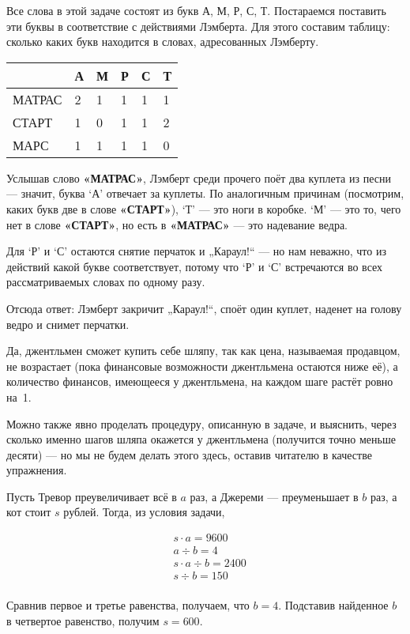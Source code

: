 
\begin{itemize}
\itA Все слова в этой задаче состоят из букв А, М, Р, С, Т. Постараемся поставить эти буквы в соответствие с действиями Лэмберта. Для этого составим таблицу: сколько каких букв находится в словах, адресованных Лэмберту.

\begin{center} \begin{tabular}{|l|l|l|l|l|l|}
\hline		& А & М & Р & С & Т \\ \hline
\ttfamily МАТРАС & 2 & 1 & 1 & 1 & 1 \\ \hline
\ttfamily СТАРТ & 1 & 0 & 1 & 1 & 2 \\ \hline
\ttfamily МАРС & 1 & 1 & 1 & 1 & 0 \\ \hline
\end{tabular} \end{center}

Услышав слово {\bfseries«МАТРАС»}, Лэмберт среди прочего поёт два куплета из песни — значит, буква `А' отвечает за куплеты. По аналогичным причинам (посмотрим, каких букв две в слове {\bfseries «СТАРТ»}), `Т' — это ноги в коробке. `М' — это то, чего нет в слове {\bfseries «СТАРТ»}, но есть в {\bfseries «МАТРАС»} — это надевание ведра.

Для `Р' и `С' остаются снятие перчаток и „Караул!“ — но нам неважно, что из действий какой букве соответствует, потому что `Р' и `С' встречаются во всех рассматриваемых словах по одному разу.

Отсюда ответ: Лэмберт закричит „Караул!“, споёт один куплет, наденет на голову ведро и снимет перчатки.

\itB Да, джентльмен сможет купить себе шляпу, так как цена, называемая продавцом, не возрастает (пока финансовые возможности джентльмена остаются ниже её), а количество финансов, имеющееся у джентльмена, на каждом шаге растёт ровно на~1.

Можно также явно проделать процедуру, описанную в задаче, и выяснить, через сколько именно шагов шляпа окажется у джентльмена (получится точно меньше десяти) — но мы не будем делать этого здесь, оставив читателю в качестве упражнения.

\itC Пусть Тревор преувеличивает всё в $a$ раз, а Джереми — преуменьшает в $b$ раз, а кот стоит $s$ рублей. Тогда, из условия задачи,

\begin{align*}
	& s \cdot a = 9600 \\
	& a \div b = 4 \\
	& s \cdot a \div b = 2400 \\
	& s \div b = 150 \\
\end{align*}

\vspace{-0.4cm}
Сравнив первое и третье равенства, получаем, что $b=4$. Подставив найденное $b$ в четвертое равенство, получим $s=600$.

\end{itemize}